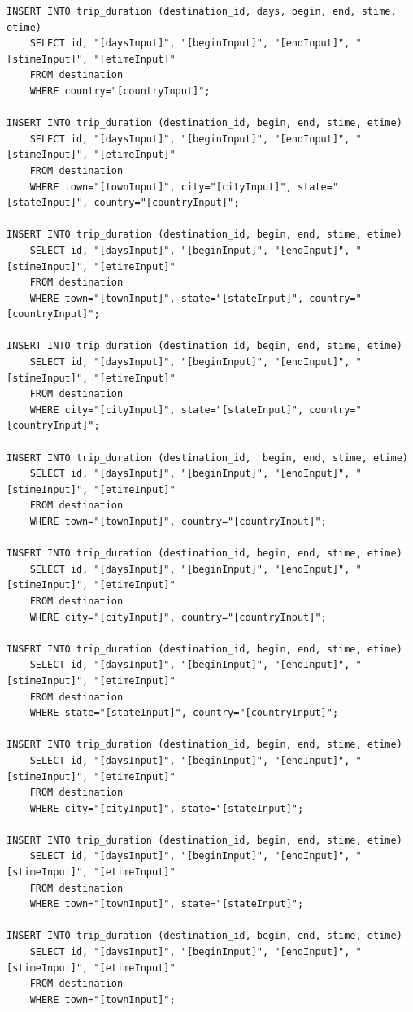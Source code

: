 \documentclass[letterpaper,10pt,onecolumn,compsoc]{IEEEtran}
\begin{document}
\begin{verbatim}
INSERT INTO trip_duration (destination_id, days, begin, end, stime, etime) 
	SELECT id, "[daysInput]", "[beginInput]", "[endInput]", "[stimeInput]", "[etimeInput]" 
	FROM destination 
	WHERE country="[countryInput]";
	
INSERT INTO trip_duration (destination_id, begin, end, stime, etime) 
	SELECT id, "[daysInput]", "[beginInput]", "[endInput]", "[stimeInput]", "[etimeInput]" 
	FROM destination 
	WHERE town="[townInput]", city="[cityInput]", state="[stateInput]", country="[countryInput]";
	
INSERT INTO trip_duration (destination_id, begin, end, stime, etime) 
	SELECT id, "[daysInput]", "[beginInput]", "[endInput]", "[stimeInput]", "[etimeInput]" 
	FROM destination 
	WHERE town="[townInput]", state="[stateInput]", country="[countryInput]";
	
INSERT INTO trip_duration (destination_id, begin, end, stime, etime) 
	SELECT id, "[daysInput]", "[beginInput]", "[endInput]", "[stimeInput]", "[etimeInput]" 
	FROM destination 
	WHERE city="[cityInput]", state="[stateInput]", country="[countryInput]";
	
INSERT INTO trip_duration (destination_id,  begin, end, stime, etime) 
	SELECT id, "[daysInput]", "[beginInput]", "[endInput]", "[stimeInput]", "[etimeInput]" 
	FROM destination 
	WHERE town="[townInput]", country="[countryInput]";
	
INSERT INTO trip_duration (destination_id, begin, end, stime, etime) 
	SELECT id, "[daysInput]", "[beginInput]", "[endInput]", "[stimeInput]", "[etimeInput]" 
	FROM destination 
	WHERE city="[cityInput]", country="[countryInput]";
	
INSERT INTO trip_duration (destination_id, begin, end, stime, etime) 
	SELECT id, "[daysInput]", "[beginInput]", "[endInput]", "[stimeInput]", "[etimeInput]" 
	FROM destination 
	WHERE state="[stateInput]", country="[countryInput]";
	
INSERT INTO trip_duration (destination_id, begin, end, stime, etime) 
	SELECT id, "[daysInput]", "[beginInput]", "[endInput]", "[stimeInput]", "[etimeInput]" 
	FROM destination 
	WHERE city="[cityInput]", state="[stateInput]";
	
INSERT INTO trip_duration (destination_id, begin, end, stime, etime) 
	SELECT id, "[daysInput]", "[beginInput]", "[endInput]", "[stimeInput]", "[etimeInput]" 
	FROM destination 
	WHERE town="[townInput]", state="[stateInput]";
	
INSERT INTO trip_duration (destination_id, begin, end, stime, etime) 
	SELECT id, "[daysInput]", "[beginInput]", "[endInput]", "[stimeInput]", "[etimeInput]" 
	FROM destination 
	WHERE town="[townInput]";
	

\end{verbatim}
\end{document}
